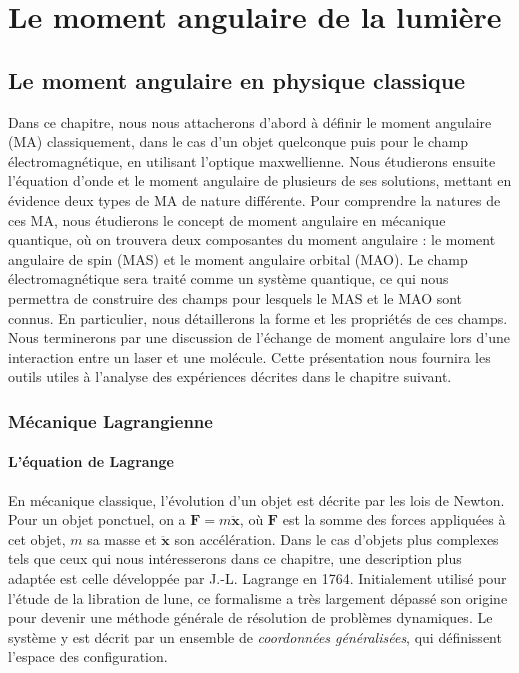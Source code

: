 \part{Le moment angulaire de la lumière}
\label{PA:LightAM}
\chapter{Le moment angulaire en physique classique}
\label{CH:ClassicAM}
Dans ce chapitre, nous nous attacherons d'abord à définir le moment angulaire (MA) classiquement, dans le cas d'un objet quelconque puis pour le champ électromagnétique, en utilisant l'optique maxwellienne. Nous étudierons ensuite l'équation d'onde et le moment angulaire de plusieurs de ses solutions, mettant en évidence deux types de MA de nature différente. Pour comprendre la natures de ces MA, nous étudierons le concept de moment angulaire en mécanique quantique, où on trouvera deux composantes du moment angulaire : le moment angulaire de spin (MAS) et le moment angulaire orbital (MAO). Le champ électromagnétique sera traité comme un système quantique, ce qui nous permettra de construire des champs pour lesquels le MAS et le MAO sont connus. En particulier, nous détaillerons la forme et les propriétés de ces champs. Nous terminerons par une discussion de l'échange de moment angulaire lors d'une interaction entre un laser et une molécule. Cette présentation nous fournira les outils utiles à l'analyse des expériences décrites dans le chapitre suivant.
\newpage
\section{Mécanique Lagrangienne}
\subsection{L'\'{e}quation de Lagrange}
\label{sec:lagrange}
En mécanique classique, l'évolution d'un objet est décrite par les lois de Newton. Pour un objet ponctuel, on a $\bm{F}=m\bm{\ddot{x}}$, où $\bm{F}$ est la somme des forces appliquées à cet objet, $m$ sa masse et $\bm{\ddot{x}}$ son accélération. Dans le cas d'objets plus complexes tels que ceux qui nous intéresserons dans ce chapitre, une description plus adaptée est celle développée par J.-L. Lagrange en 1764. Initialement utilisé pour l'étude de la libration de lune, ce formalisme a très largement dépassé son origine pour devenir une méthode générale de résolution de problèmes dynamiques. Le système y est décrit par un ensemble de \textit{coordonnées généralisées}, qui définissent l'espace des configuration. 

